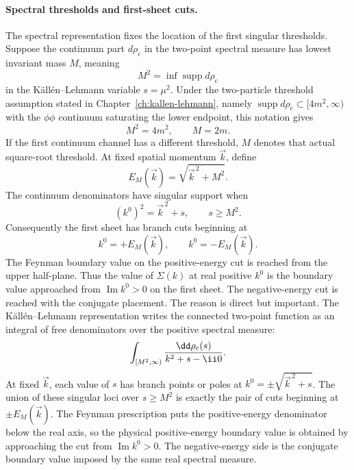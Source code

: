 \paragraph{Spectral thresholds and first-sheet cuts.}
The spectral representation fixes the location of the first singular
thresholds. Suppose the continuum part \(d\rho_{\mathrm c}\) in the two-point
spectral measure has lowest invariant mass \(M\), meaning
\[
  M^2
  =
  \inf \operatorname{supp} d\rho_{\mathrm c}
\]
in the K\"all\'en--Lehmann variable \(s=\mu^2\).  Under the two-particle
threshold assumption stated in Chapter~\ref{ch:kallen-lehmann}, namely
\(\operatorname{supp}d\rho_{\mathrm c}\subset[4m^2,\infty)\) with the
\(\phi\phi\) continuum saturating the lower endpoint, this notation gives
\[
  M^2=4m^2,\qquad M=2m .
\]
If the first continuum channel has a different threshold, \(M\) denotes that
actual square-root threshold. At fixed spatial momentum \(\vec k\), define
\[
  E_M(\vec k)=\sqrt{\vec k^{\,2}+M^2}.
\]
The continuum denominators have singular support when
\[
  (k^0)^2=\vec k^{\,2}+s,
  \qquad s\ge M^2.
\]
Consequently the first sheet has branch cuts beginning at
\[
  k^0=+E_M(\vec k),
  \qquad
  k^0=-E_M(\vec k).
\]
The Feynman boundary value on the positive-energy cut is reached from the
upper half-plane. Thus the value of \(\Sigma(k)\) at real positive \(k^0\) is
the boundary value approached from \(\operatorname{Im}k^0>0\) on the first
sheet. The negative-energy cut is reached with the conjugate placement.
The reason is direct but important.  The K\"all\'en--Lehmann representation
writes the connected two-point
function as an integral of free denominators over the positive spectral
measure:
\[
  \int_{[M^2,\infty)}\frac{\dd\rho_{\rm c}(s)}
  {k^2+s-\ii0}.
\]
At fixed \(\vec k\), each value of \(s\) has branch points or poles at
\(k^0=\pm\sqrt{\vec k^{\,2}+s}\).  The union of these singular loci over
\(s\ge M^2\) is exactly the pair of cuts beginning at
\(\pm E_M(\vec k)\).  The Feynman prescription puts the positive-energy
denominator below the real axis, so the physical positive-energy boundary
value is obtained by approaching the cut from \(\operatorname{Im}k^0>0\).
The negative-energy side is the conjugate boundary value imposed by the same
real spectral measure.

